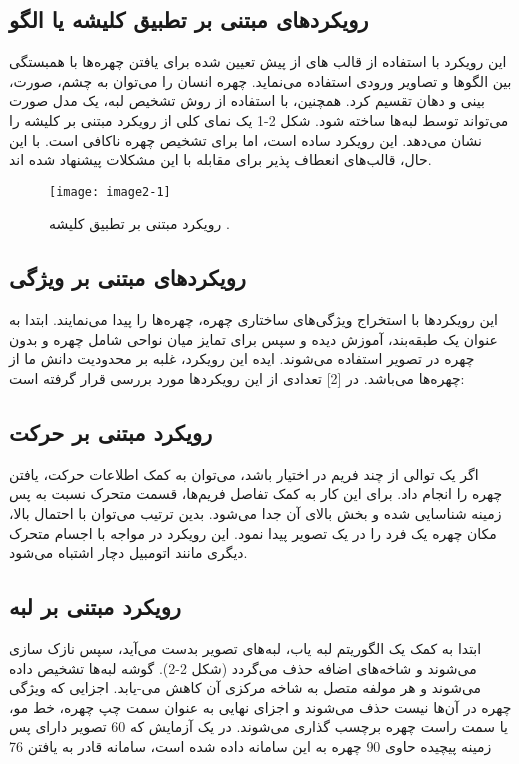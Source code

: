 \subsection{رویکردهای مبتنی بر تطبیق کلیشه یا الگو}
این رویکرد با استفاده از قالب ‌های از پیش تعیین شده برای یافتن چهره‌ها با همبستگی بین الگوها و تصاویر ورودی استفاده می‌نماید. چهره انسان را می‌توان به چشم، صورت، بینی و دهان تقسیم کرد. همچنین، با استفاده از روش تشخیص لبه، یک مدل صورت می‌تواند توسط لبه‌ها ساخته شود. شکل 2-1 یک نمای کلی از رویکرد مبتنی بر کلیشه را نشان می‌دهد. این رویکرد ساده است، اما برای تشخیص چهره ناکافی است. با این حال، قالب‌های انعطاف پذیر برای مقابله با این مشکلات پیشنهاد شده اند.


\begin{figure}[h]
\centering
  \texttt{[image: image2-1]}
  \caption{رویکرد مبتنی بر تطبیق کلیشه  \cite{ref1}.}
  \label{image2-1}
\end{figure}

\subsection{رویکردهای مبتنی بر ویژگی}
این رویکردها‌ با استخراج ویژگی‌های ساختاری چهره، چهره‌ها را پیدا می‌نمایند. ابتدا به عنوان یک طبقه‌بند، آموزش دیده و سپس برای تمایز میان نواحی شامل چهره و بدون چهره در تصویر استفاده می‌شوند. ایده این رویکرد، غلبه بر محدودیت دانش ما از چهره‌ها می‌باشد. در [2] تعدادی از این رویکردها مورد بررسی قرار گرفته است:
\subsection{رویکرد مبتنی بر حرکت}
اگر یک توالی از چند فریم در اختیار باشد، می‌توان به کمک اطلاعات حرکت، یافتن چهره را انجام داد. برای این کار به کمک تفاصل فریم‌ها، قسمت متحرک نسبت به پس زمینه شناسایی شده و بخش بالای آن جدا می‌شود. بدین ترتیب می‌توان با احتمال بالا، مکان چهره یک فرد را در یک تصویر پیدا نمود. این رویکرد در مواجه با اجسام متحرک دیگری مانند اتومبیل دچار اشتباه می‌شود.

\subsection{رویکرد مبتنی بر لبه}
ابتدا به کمک یک الگوریتم لبه یاب، لبه‌های تصویر بدست می‌آید، سپس نازک سازی می‌شوند و شاخه‌های اضافه حذف می‌گردد (شکل 2-2). گوشه لبه‌ها تشخیص داده می‌شوند و هر مولفه متصل  به شاخه مرکزی آن کاهش می-یابد. اجزایی که ویژگی چهره در آن‌ها نیست حذف می‌شوند و اجزای نهایی به عنوان سمت چپ چهره، خط مو، یا سمت راست چهره برچسب گذاری می‌شوند. در یک آزمایش که 60 تصویر دارای پس زمینه پیچیده حاوی 90 چهره به این سامانه داده شده است، سامانه قادر به یافتن 76%

